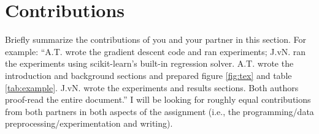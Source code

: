 
\section{Contributions}
\label{sec:contrib}

Briefly summarize the contributions of you and your partner in this
section. For example: ``A.T. wrote the gradient descent code and ran
experiments; J.vN. ran the experiments using scikit-learn's built-in
regression solver. A.T. wrote the introduction and background sections
and prepared figure \ref{fig:tex} and table
\ref{tab:example}. J.vN. wrote the experiments and results
sections. Both authors proof-read the entire document.'' I will be
looking for roughly equal contributions from both partners in both
aspects of the assignment (i.e., the programming/data
preprocessing/experimentation and writing).

